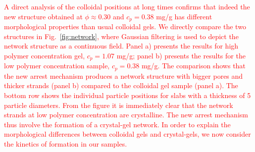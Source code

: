\documentclass[preprint,amsmath,amssymb,superscriptaddress]{revtex4}
\begin{document}
% 

% 
% 

\textcolor{red}{
A direct analysis of the colloidal positions at long times confirms that indeed the new structure obtained at
$\phi\approx 0.30$ and $c_p=0.38$ mg/g has different morphological properties than usual colloidal gels.
We directly compare the two structures in Fig.~\ref{fig:network}, where Gaussian filtering is used to depict the network structure as a continuous field.
Panel a) presents the results for high
polymer concentration gel, $c_p=1.07$ mg/g; panel b) presents the results for the low polymer concentration sample, $c_p=0.38$ mg/g.
The comparison shows that the new arrest mechanism produces a network structure with bigger pores and thicker strands (panel b) compared
to the colloidal gel sample (panel a). The bottom row shows the individual particle positions for slabs with a thickness of 5 particle diameters.
From the figure it is immediately clear that the network strands at low polymer concentration are crystalline. The new arrest mechanism thus
involve the formation of a crystal-gel network. In order to explain the morphological differences between colloidal gels and crystal-gels,
we now consider the kinetics of formation in our samples.}
\end{document}
